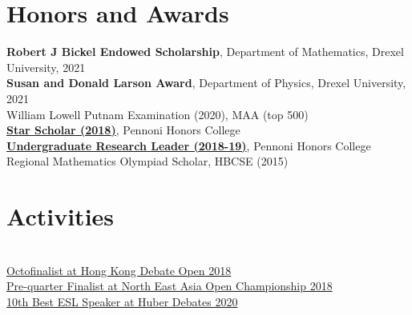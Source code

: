 \documentclass[]{deedy-resume-openfont}
\begin{document}
\begin{minipage}[t]{0.44\textwidth}
\section{Honors and Awards} 
\textbullet{} \textbf{Robert J Bickel Endowed Scholarship}, Department of Mathematics, Drexel University, 2021 \\
\textbullet{} \textbf{Susan and Donald Larson Award}, Department of Physics, Drexel University, 2021 \\
\textbullet{} William Lowell Putnam Examination (2020), MAA (top 500) \\
\textbullet{} \textbf{\href{https://drexel.edu/undergraduate-research/STAR-scholars/summer-showcase/}{Star Scholar (2018)}}, Pennoni Honors College \\
\textbullet{}\textbf{\href{https://drexel.edu/undergraduate-research/research-benefits/undergraduate-research-leaders/Meet\%20the\%20URLs/}{Undergraduate Research Leader (2018-19)}}, Pennoni Honors College   \\
\textbullet{} Regional Mathematics Olympiad Scholar, HBCSE (2015)\\




\section{Activities} 
\vspace{3}
\\
\href{https://www.facebook.com/hkdo2018/?ref=page_internal}{Octofinalist at Hong Kong Debate Open 2018} \\
\href{https://www.facebook.com/Debattierclub.Muenchen/photos/a.1618436488221546/2108417185890138/?type=3}{Pre-quarter Finalist at North East Asia Open Championship 2018} \\
\href{https://files.forensicstournament.net/results/2970-Speaker\%20Awards.pdf}{10th Best ESL Speaker at Huber Debates 2020}\\



\end{minipage}
\end{document}
